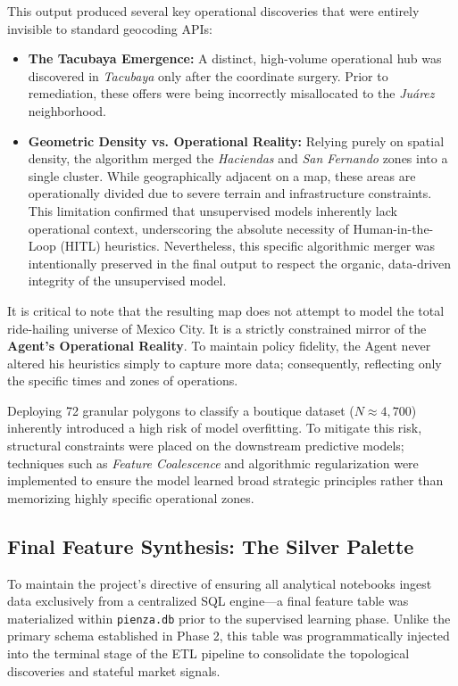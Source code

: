 This output produced several key operational discoveries that were entirely invisible to standard geocoding APIs:
\begin{itemize}[noitemsep, topsep=3pt]
    \item \textbf{The Tacubaya Emergence:} A distinct, high-volume operational hub was discovered in \textit{Tacubaya} only after the coordinate surgery. Prior to remediation, these offers were being incorrectly misallocated to the \textit{Juárez} neighborhood.
    \item \textbf{Geometric Density vs. Operational Reality:} Relying purely on spatial density, the algorithm merged the \textit{Haciendas} and \textit{San Fernando} zones into a single cluster. While geographically adjacent on a map, these areas are operationally divided due to severe terrain and infrastructure constraints. This limitation confirmed that unsupervised models inherently lack operational context, underscoring the absolute necessity of Human-in-the-Loop (HITL) heuristics. Nevertheless, this specific algorithmic merger was intentionally preserved in the final output to respect the organic, data-driven integrity of the unsupervised model.
\end{itemize}


It is critical to note that the resulting map does not attempt to model the total ride-hailing universe of Mexico City. It is a strictly constrained mirror of the \textbf{Agent's Operational Reality}. To maintain policy fidelity, the Agent never altered his heuristics simply to capture more data; consequently, reflecting only the specific times and zones of operations. 

Deploying 72 granular polygons to classify a boutique dataset ($N \approx 4,700$) inherently introduced a high risk of model overfitting. To mitigate this risk, structural constraints were placed on the downstream predictive models; techniques such as \textit{Feature Coalescence} and algorithmic regularization were implemented to ensure the model learned broad strategic principles rather than memorizing highly specific operational zones.


\subsection{Final Feature Synthesis: The Silver Palette}
To maintain the project’s directive of ensuring all analytical notebooks ingest data exclusively from a centralized SQL engine—a final feature table was materialized within \texttt{pienza.db} prior to the supervised learning phase. Unlike the primary schema established in Phase 2, this table was programmatically injected into the terminal stage of the ETL pipeline to consolidate the topological discoveries and stateful market signals.

